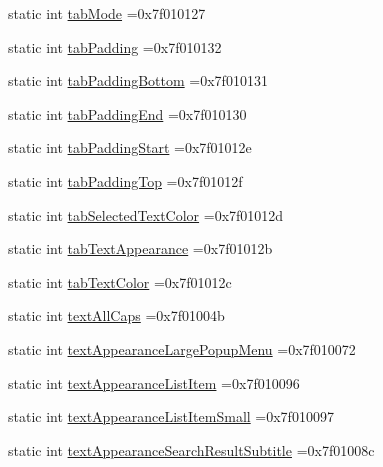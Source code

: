 \begin{DoxyCompactItemize}
\item 
static int \hyperlink{classandroid_1_1support_1_1v7_1_1appcompat_1_1R_1_1attr_aa0a566b845b8df7ff84ec70c2aadf43f}{tab\+Mode} =0x7f010127
\item 
static int \hyperlink{classandroid_1_1support_1_1v7_1_1appcompat_1_1R_1_1attr_ac37623bb19deedc0d9bdba8edec8c166}{tab\+Padding} =0x7f010132
\item 
static int \hyperlink{classandroid_1_1support_1_1v7_1_1appcompat_1_1R_1_1attr_ac6b8ff7fa2ba7d246035a5176ee4a1da}{tab\+Padding\+Bottom} =0x7f010131
\item 
static int \hyperlink{classandroid_1_1support_1_1v7_1_1appcompat_1_1R_1_1attr_a1e0b501d6627fdcb2f6c08d3eb8efe01}{tab\+Padding\+End} =0x7f010130
\item 
static int \hyperlink{classandroid_1_1support_1_1v7_1_1appcompat_1_1R_1_1attr_afb55623b8ecb6bc5f717ad08c4878c05}{tab\+Padding\+Start} =0x7f01012e
\item 
static int \hyperlink{classandroid_1_1support_1_1v7_1_1appcompat_1_1R_1_1attr_a7095b04954f6877225cff0ea0097259a}{tab\+Padding\+Top} =0x7f01012f
\item 
static int \hyperlink{classandroid_1_1support_1_1v7_1_1appcompat_1_1R_1_1attr_aea27d1caa0bd5fcc2e45b2879ed95361}{tab\+Selected\+Text\+Color} =0x7f01012d
\item 
static int \hyperlink{classandroid_1_1support_1_1v7_1_1appcompat_1_1R_1_1attr_ade27c2db1b2e6562fc6b3db5270492de}{tab\+Text\+Appearance} =0x7f01012b
\item 
static int \hyperlink{classandroid_1_1support_1_1v7_1_1appcompat_1_1R_1_1attr_a149b5c83b059d57ad457eeafb2767bef}{tab\+Text\+Color} =0x7f01012c
\item 
static int \hyperlink{classandroid_1_1support_1_1v7_1_1appcompat_1_1R_1_1attr_a3bd1f2ce4b725772d80858408dc8d52c}{text\+All\+Caps} =0x7f01004b
\item 
static int \hyperlink{classandroid_1_1support_1_1v7_1_1appcompat_1_1R_1_1attr_abd33adb2cdd277a5d91cc85a8800492b}{text\+Appearance\+Large\+Popup\+Menu} =0x7f010072
\item 
static int \hyperlink{classandroid_1_1support_1_1v7_1_1appcompat_1_1R_1_1attr_ae0a52709ab8a3d80bcf2f6c11eea15f4}{text\+Appearance\+List\+Item} =0x7f010096
\item 
static int \hyperlink{classandroid_1_1support_1_1v7_1_1appcompat_1_1R_1_1attr_aea315fe4ee810427ffa088c85d96aea3}{text\+Appearance\+List\+Item\+Small} =0x7f010097
\item 
static int \hyperlink{classandroid_1_1support_1_1v7_1_1appcompat_1_1R_1_1attr_a935e2928c7cafbfb3b6843566c6719c9}{text\+Appearance\+Search\+Result\+Subtitle} =0x7f01008c

\end{DoxyCompactItemize}
